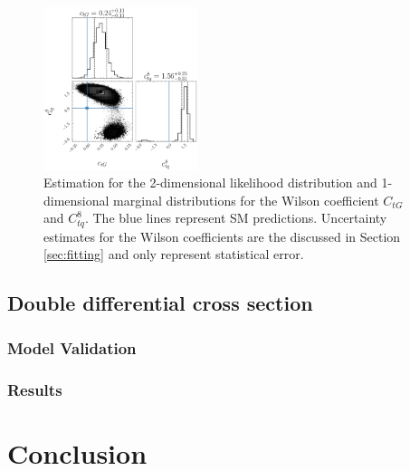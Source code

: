 \documentclass[a4paper]{article}
\begin{document}
\begin{figure}
    \centering
    \includegraphics[width=0.4\textwidth]{plots/ATLAS-ctg-ctq8_1D_2OP.png}
    \caption{Estimation for the 2-dimensional likelihood distribution and 1-dimensional marginal distributions for the Wilson coefficient $C_{tG}$ and $C_{tq}^{8}$. The blue lines represent SM predictions. Uncertainty estimates for the Wilson coefficients are the discussed in Section \ref{sec:fitting} and only represent statistical error.}
    \label{fig:corner_1D_2OP}
\end{figure}


\subsection{Double differential cross section}
\subsubsection{Model Validation}
\subsubsection{Results}

\section{Conclusion}

\newpage
\begingroup
\raggedright{}
\sloppy
\printbibliography{}
\endgroup
\end{document}

